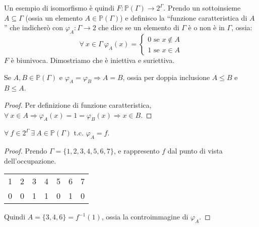 Un esempio di isomorfismo \`e quindi $F : \mathbb{P}(\Gamma) \to 2^{\Gamma}$. Prendo un sottoinsieme $A \subseteq \Gamma$ (ossia un elemento $A \in \mathbb{P}(\Gamma)$) e definisco la ``funzione caratteristica di $A$'' che indicher\`o con $\varphi_{A} : \Gamma \to 2$ che dice se un elemento di $\Gamma$ \`e o non \`e in $\Gamma$, ossia:
\[
\forall \ x \in \Gamma \ \varphi_A (x) = 
\begin{cases}
0 \text{ se } x \notin A \\
1 \text{ se } x \in A
\end{cases}
\]
$F$ \`e biunivoca. Dimostriamo che \`e iniettiva e suriettiva.
\begin{prop}
Se $A, B \in \mathbb{P}(\Gamma)$ e $\varphi_A = \varphi_B \Rightarrow A = B$, ossia per doppia inclusione $A \le B$ e $B \le A$.
\end{prop}
\begin{proof}
Per definizione di funzione caratteristica, $\forall \ x \in A \Rightarrow \varphi_A(x) = 1 = \varphi_B(x) \Rightarrow x \in B$.
\end{proof}
\begin{prop}
$\forall \ f \in 2^{\Gamma} \ \exists \ A \in \mathbb{P}(\Gamma)$ t.c. $\varphi_A = f$.
\end{prop}
\begin{proof}
Prendo $\Gamma = \{ 1, 2, 3, 4, 5, 6, 7\}$, e rappresento $f$ dal punto di vista dell'occupazione.

\begin{tabular}{ccccccc}
1 & 2 & 3 & 4 & 5 & 6 & 7 \\
0 & 0 & 1 & 1 & 0 & 1 & 0
\end{tabular}

Quindi $A = \{ 3, 4, 6 \} = f^{-1} (1)$, ossia la controimmagine di $\varphi_A$.
\end{proof}

